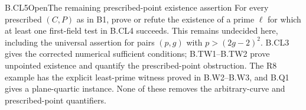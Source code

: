 \begin{claim}{B.CL5}{Open}{The remaining prescribed-point existence assertion}
For every prescribed $(C,P)$ as in B1, prove or refute the
existence of a prime $\ell$ for which at least one first-field
test in B.CL4 succeeds. This remains undecided here, including
the universal assertion for pairs $(p,g)$ with
$p>(2g-2)^2$. B.CL3 gives the corrected numerical sufficient
conditions; B.TW1--B.TW2 prove unpointed existence and quantify
the prescribed-point obstruction. The R8 example has the
explicit least-prime witness proved in B.W2--B.W3, and B.Q1
gives a plane-quartic instance. None of these removes the
arbitrary-curve and prescribed-point quantifiers.
\end{claim}
